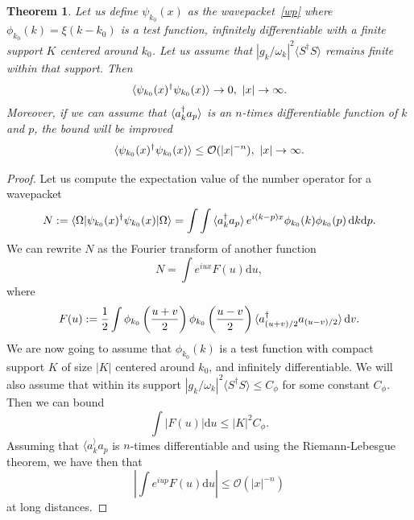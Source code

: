 \documentclass[notitlepage, prx, preprint, amsmath,superscriptaddress,amssymb]{revtex4-1}
\newtheorem{theorem}{Theorem}[section]
\begin{document}
\begin{theorem}
\label{eq:bound-x}
Let us define $\psi_{k_0}(x)$ as the wavepacket\ \eqref{wp} where $\phi_{k_0}(k)=\xi(k-k_0)$ is a test function, infinitely differentiable with a finite support $K$ centered around $k_0$. Let us assume that $|g_k/\omega_k|^2\langle S^\dagger S \rangle$ remains finite within that support. Then
\begin{equation}
\braket{\psi_{k_0}(x)^\dagger \psi_{k_0}(x)} \to 0,~|x|\to\infty.
\end{equation}
Moreover, if we can assume that $\braket{a_k^\dagger a_p}$ is an $n$-times differentiable function of $k$ and $p$, the bound will be improved
\begin{equation}
\braket{\psi_{k_0}(x)^\dagger \psi_{k_0}(x)} \leq  \mathcal{O}(|x|^{-n}), ~|x|\to\infty.
\end{equation}
\end{theorem}

\begin{proof}
Let us compute the expectation value of the number operator for a wavepacket
\begin{equation}
N := \braket{\Omega|\psi_{k_0}(x)^\dagger\psi_{k_0}(x)|\Omega}
= \int\int\braket{a_k^\dagger a_p} e^{i(k-p)x} \phi_{k_0}(k)\phi_{k_0}(p)\,\mathrm{d}k\mathrm{d}p.
\end{equation}
We can rewrite $N$ as the Fourier transform of another function
\begin{equation}
N = \int e^{i u x} F(u) \mathrm{d}u,
\end{equation}
where
\begin{equation}
F(u) := \frac{1}{2} \int \phi_{k_0}\left(\frac{u+v}{2}\right)\phi_{k_0}\left(\frac{u-v}{2}\right)
\braket{a_{(u+v)/2}^\dagger a_{(u-v)/2}}\mathrm{d}v.
\end{equation}
We are now going to assume that $\phi_{k_0}(k)$ is a test function with compact support $K$ of size $|K|$ centered around $k_0$, and infinitely differentiable. We will also assume that within its support $|g_k/\omega_k|^2 \langle S^\dagger S \rangle \leq C_\phi$ for some constant $C_\phi$. Then we can bound
\begin{equation}
\int |F(u)|\mathrm{d}u \leq |K|^2 C_\phi.
\end{equation}
Assuming that $\langle a_k^\rangle a_p$ is $n$-times differentiable and 
using the Riemann-Lebesgue theorem, we have then that
\begin{equation}
\left|\int e^{i u p} F(u)\mathrm{d}u\right| \leq \mathcal{O}\left(|x|^{-n}\right)
\end{equation}
at long distances. 
\end{proof}
\end{document}
